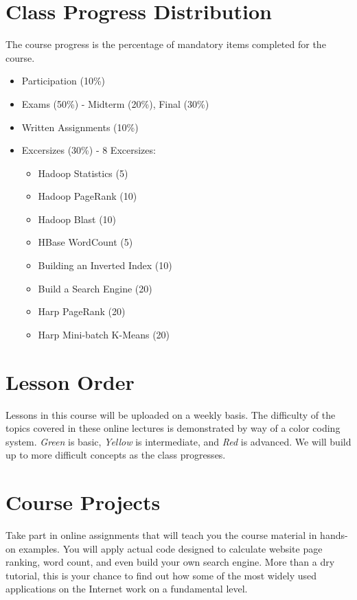 \section{Class Progress Distribution}

The course progress is the percentage of mandatory items completed for
the course.

\begin{itemize}
  \item Participation (10\%)
  \item Exams (50\%) - Midterm (20\%), Final (30\%)
  \item Written Assignments (10\%)
  \item Excersizes (30\%) - 8 Excersizes: 
    \begin{itemize}
      \item Hadoop Statistics (5)
      \item Hadoop PageRank (10)
      \item Hadoop Blast (10)
      \item HBase WordCount (5)
      \item Building an Inverted Index (10)
      \item Build a Search Engine (20)
      \item Harp PageRank (20)
      \item Harp Mini-batch K-Means (20)
    \end{itemize}
\end{itemize}

\section{Lesson Order}

Lessons in this course will be uploaded on a weekly basis. The
difficulty of the topics covered in these online lectures is
demonstrated by way of a color coding system. {\em Green} is basic,
{\em Yellow} is intermediate, and {\em Red} is advanced. We will build
up to more difficult concepts as the class progresses.

\section{Course Projects}

Take part in online assignments that will teach you the course
material in hands-on examples. You will apply actual code designed to
calculate website page ranking, word count, and even build your own
search engine. More than a dry tutorial, this is your chance to find
out how some of the most widely used applications on the Internet work
on a fundamental level.


